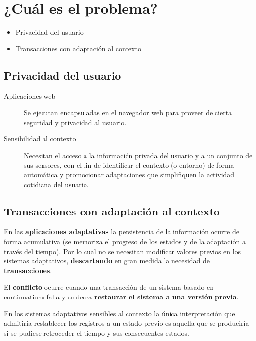 \documentclass[
paper=128mm:96mm, %
fontsize=11pt, %
pagesize, %
parskip=half-, %
]{scrartcl} %
\theoremstyle{mythmstyle} %
\begin{document}
\section{¿Cuál es el problema?}

\begin{itemize}
\item Privacidad del usuario
\item Transacciones con adaptación al contexto
\end{itemize}

\clearpage

\subsection{Privacidad del usuario}

\begin{description}
\item[Aplicaciones web] Se ejecutan encapsuladas en el navegador web para proveer de cierta seguridad y privacidad al usuario.
\item[Sensibilidad al contexto] Necesitan el acceso a la información privada del usuario y a un conjunto de sus sensores, con el fin de identificar el contexto (o entorno) de forma automática y promocionar adaptaciones que simplifiquen la actividad cotidiana del usuario.
\end{description}

\clearpage

\subsection{Transacciones con adaptación al contexto}

En las \textbf{aplicaciones adaptativas} la persistencia de la información ocurre de forma acumulativa (se memoriza el progreso de los estados y de la adaptación a través del tiempo). Por lo cual no se necesitan modificar valores previos en los sistemas adaptativos, \textbf{descartando} en gran medida la necesidad de \textbf{transacciones}.

El \textbf{conflicto} ocurre cuando una transacción de un sistema basado en continuations falla y se desea \textbf{restaurar el sistema a una versión previa}.

En los sistemas adaptativos sensibles al contexto la única interpretación que admitiría restablecer los registros a un estado previo es aquella que se produciría si se pudiese retroceder el tiempo y sus consecuentes estados.
\end{document}
